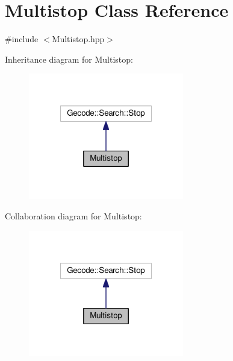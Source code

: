 \hypertarget{class_multistop}{\section{Multistop Class Reference}
\label{class_multistop}
}


{\ttfamily \#include $<$Multistop.\-hpp$>$}



Inheritance diagram for Multistop\-:\nopagebreak
\begin{figure}[H]
\begin{center}
\leavevmode
\includegraphics[width=192pt]{class_multistop__inherit__graph}
\end{center}
\end{figure}


Collaboration diagram for Multistop\-:\nopagebreak
\begin{figure}[H]
\begin{center}
\leavevmode
\includegraphics[width=192pt]{class_multistop__coll__graph}
\end{center}
\end{figure}
